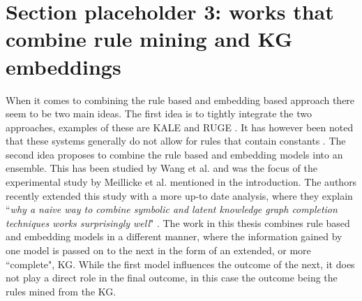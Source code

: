 \section{Section placeholder 3: works that combine rule mining and KG embeddings}
When it comes to combining the rule based and embedding based approach there seem to be two main ideas. The first idea is to tightly integrate the two approaches, examples of these are KALE \cite{KALE} and RUGE \cite{RUGE}. It has however been noted that these systems generally do not allow for rules that contain constants \cite{meilicke2021naive}. The second idea proposes to combine the rule based and embedding models into an ensemble. This has been studied by Wang et al. \cite{wang2018multi} and was the focus of the experimental study by Meillicke et al. \cite{ensemble} mentioned in the introduction. The authors recently extended this study with a more up-to date analysis, where they explain ``\textit{why a naive way to combine symbolic and latent knowledge graph
completion techniques works surprisingly well}" \cite{meilicke2021naive}. The work in this thesis combines rule based and embedding models in a different manner, where the information gained by one model is passed on to the next in the form of an extended, or more ``complete", KG. While the first model influences the outcome of the next, it does not play a direct role in the final outcome, in this case the outcome being the rules mined from the KG.

